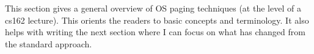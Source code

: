 This section gives a general overview of OS paging techniques (at the level of a cs162 lecture). This orients the readers to basic concepts and terminology. It also helps with writing the next section where I can focus on what has changed from the standard approach.